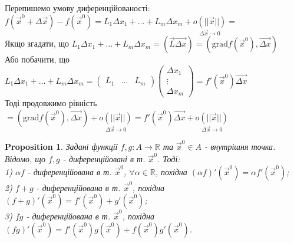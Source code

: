 \documentclass[a4paper, 10pt]{article}
\def\bigline{\vspace{5mm}\\}
\theoremstyle{theoremdd}
\theoremstyle{theoremdd}
\theoremstyle{theoremdd}
\theoremstyle{theoremdd}
\theoremstyle{theoremdd}
\newtheorem{proposition}[theorem]{Proposition}
\theoremstyle{theoremdd}
\theoremstyle{theoremdd}
\theoremstyle{theoremdd}
\begin{document}
Перепишемо умову диференційованості:\\
$f(\vec{x}^0 + \Delta \vec{x}) - f(\vec{x}^0) = L_1 \Delta x_1 + \dots + L_m \Delta x_m + \underset{\Delta \vec{x} \to 0}{o(||\vec{x}||)} \boxed{=}$\\
Якщо згадати, що $L_1 \Delta x_1 + \dots + L_m \Delta x_m = \left( \overrightarrow{L} \overrightarrow{\Delta x} \right) = \left(\textrm{grad} f(\vec{x}^0), \overrightarrow{\Delta x}\right)$\\
Або побачити, що $L_1 \Delta x_1 + \dots + L_m \Delta x_m = \begin{pmatrix}
L_1 & \dots & L_m
\end{pmatrix} \begin{pmatrix}
\Delta x_1 \\ \vdots \\ \Delta x_m
\end{pmatrix} = f'(\vec{x}^0) \overrightarrow{\Delta x}$\\
Тоді продовжимо рівність\\
$\boxed{=} \left(\textrm{grad} f(\vec{x}^0), \overrightarrow{\Delta x}\right) + \underset{\Delta \vec{x} \to 0}{o(||\vec{x}||)} = f'(\vec{x}^0) \overrightarrow{\Delta x} + \underset{\Delta \vec{x} \to 0}{o(||\vec{x}||)}$
\bigline
\fi

\begin{proposition}
Задані функції $f,g: A \to \mathbb{R}$ та $\vec{x}^0 \in A$ - внутрішня точка. Відомо, що $f,g$ - диференційовані в т. $\vec{x}^0$. Тоді:\\
1) $\alpha f$ - диференційована в т. $\vec{x}^0$, $\forall \alpha \in \mathbb{R}$, похідна $(\alpha f)'(\vec{x}^0) = \alpha f'(\vec{x}^0)$;\\
2) $f + g$ - диференційована в т. $\vec{x}^0$, похідна $(f+g)'(\vec{x}^0) = f'(\vec{x}^0)+g'(\vec{x}^0)$;\\
3) $fg$ - диференційована в т. $\vec{x}^0$, похідна $(fg)'(\vec{x}^0) = f'(\vec{x}^0) g(\vec{x}^0) + f(\vec{x}^0)g'(\vec{x}^0)$.
\end{proposition}
\end{document}
